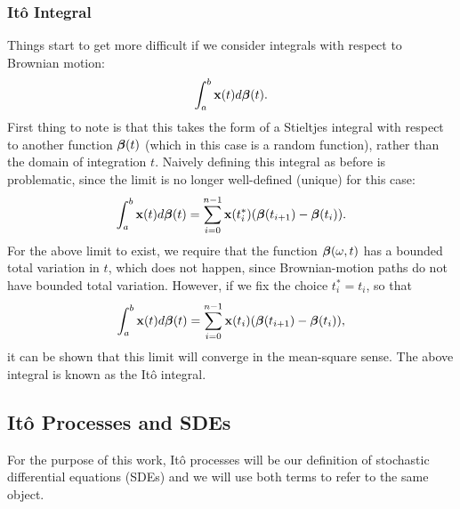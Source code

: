 \documentclass[a4paper,12pt,twoside,openright]{report}
\theoremstyle{definition}
\begin{document}
\subsubsection{Itô Integral}
Things start to get more difficult if we consider integrals with respect to Brownian motion:
\begin{align}\label{eq:brownian_integral}
    \int_{a}^b {\mathbf{x}}(t) d{\bm{\beta}}(t).
\end{align}
First thing to note is that this takes the form of a Stieltjes integral with respect to another function ${\bm{\beta}}(t)$ (which in this case is a random function), rather than the domain of integration $t$. Naively defining this integral as before is problematic, since the limit is no longer well-defined (unique) for this case:
\begin{align}\label{eq:brownian_integral_bad}
    \int_{a}^b {\mathbf{x}}(t) d{\bm{\beta}}(t) = \sum_{i=0}^{n-1} {\mathbf{x}}(t^{*}_i)({\bm{\beta}}(t_{i+1}) - {\bm{\beta}}(t_i)).
\end{align}
For the above limit to exist, we require that the function ${\bm{\beta}}(\omega, t)$ has a bounded total variation in $t$, which does not happen, since Brownian-motion paths do not have bounded total variation. However, if we fix the choice $t_i^{*} = t_i$, so that
\begin{align}\label{eq:ito_integral}
    \int_{a}^b {\mathbf{x}}(t) d{\bm{\beta}}(t) = \sum_{i=0}^{n-1} {\mathbf{x}}(t_i)({\bm{\beta}}(t_{i+1}) - {\bm{\beta}}(t_i)),
\end{align}
it can be shown that this limit will converge in the mean-square sense. The above integral is known as the Itô integral.
\subsection{Itô Processes and SDEs}

For the purpose of this work, Itô processes will be our definition of stochastic differential equations (SDEs) and we will use both terms to refer to the same object.
\end{document}
